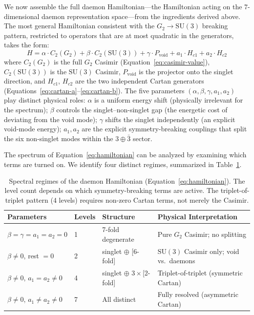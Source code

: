 \documentclass[12pt,a4paper]{article}
\begin{document}
We now assemble the full daemon Hamiltonian---the Hamiltonian acting on the 7-dimensional daemon representation space---from the ingredients derived above. The most general Hamiltonian consistent with the $G_2 \to \mathrm{SU}(3)$ breaking pattern, restricted to operators that are at most quadratic in the generators, takes the form:
\begin{equation}
H = \alpha \cdot C_2(G_2) + \beta \cdot C_2(\mathrm{SU}(3)) + \gamma \cdot P_{\mathrm{void}} + a_1 \cdot H_{c1} + a_2 \cdot H_{c2}
\label{eq:hamiltonian}
\end{equation}
where $C_2(G_2)$ is the full $G_2$ Casimir (Equation~\ref{eq:casimir-value}), $C_2(\mathrm{SU}(3))$ is the $\mathrm{SU}(3)$ Casimir, $P_{\mathrm{void}}$ is the projector onto the singlet direction, and $H_{c1}$, $H_{c2}$ are the two independent Cartan generators (Equations~\ref{eq:cartan-a}--\ref{eq:cartan-b}). The five parameters $(\alpha, \beta, \gamma, a_1, a_2)$ play distinct physical roles: $\alpha$ is a uniform energy shift (physically irrelevant for the spectrum); $\beta$ controls the singlet--non-singlet gap (the energetic cost of deviating from the void mode); $\gamma$ shifts the singlet independently (an explicit void-mode energy); $a_1, a_2$ are the explicit symmetry-breaking couplings that split the six non-singlet modes within the $3 \oplus \bar{3}$ sector.

The spectrum of Equation~\eqref{eq:hamiltonian} can be analyzed by examining which terms are turned on. We identify four distinct regimes, summarized in Table~\ref{tab:regimes}.

\begin{table}[ht]
\centering
\caption{Spectral regimes of the daemon Hamiltonian (Equation~\ref{eq:hamiltonian}). The level count depends on which symmetry-breaking terms are active. The triplet-of-triplet pattern (4 levels) requires non-zero Cartan terms, not merely the Casimir.}
\label{tab:regimes}
\small
\begin{tabular}{@{}llll@{}}
\toprule
Parameters & Levels & Structure & Physical Interpretation \\
\midrule
$\beta = \gamma = a_1 = a_2 = 0$ & 1 & 7-fold degenerate & Pure $G_2$ Casimir; no splitting \\
$\beta \neq 0$, rest $= 0$ & 2 & singlet $\oplus$ [6-fold] & $\mathrm{SU}(3)$ Casimir only; void vs.\ daemons \\
$\beta \neq 0$, $a_1 = a_2 \neq 0$ & 4 & singlet $\oplus$ $3 \times$[2-fold] & Triplet-of-triplet (symmetric Cartan) \\
$\beta \neq 0$, $a_1 \neq a_2 \neq 0$ & 7 & All distinct & Fully resolved (asymmetric Cartan) \\
\bottomrule
\end{tabular}
\end{table}
\end{document}
